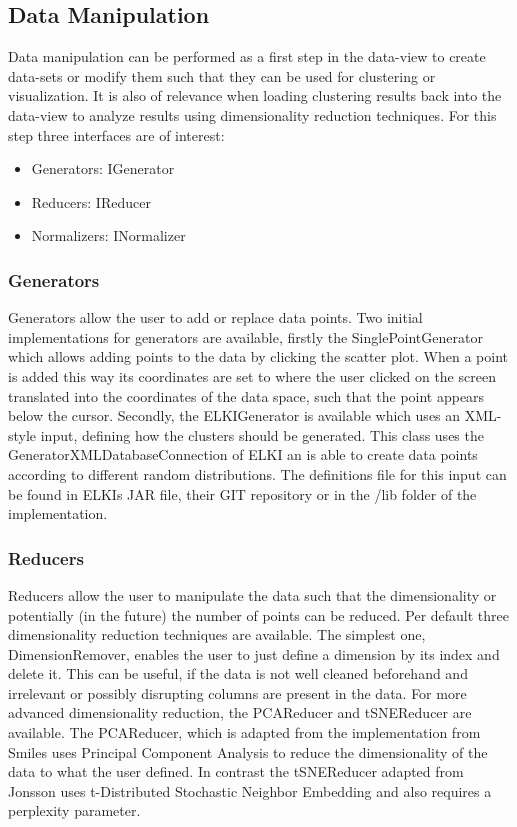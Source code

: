 \documentclass[
	a4paper,
	english,
	twoside,
	openright,               
	11pt                            
	]{report}
\begin{document}
\subsection{Data Manipulation}

Data manipulation can be performed as a first step in the data-view to create data-sets or modify them such that they can be used for clustering or visualization. It is also of relevance when loading clustering results back into the data-view to analyze results using dimensionality reduction techniques. For this step three interfaces are of interest:

\begin{itemize}
  \item Generators: IGenerator
  \item Reducers: IReducer
  \item Normalizers: INormalizer
\end{itemize}

\subsubsection{Generators}
Generators allow the user to add or replace data points. Two initial implementations for generators are available, firstly the SinglePointGenerator which allows adding points to the data by clicking the scatter plot. When a point is added this way its coordinates are set to where the user clicked on the screen translated into the coordinates of the data space, such that the point appears below the cursor. Secondly, the ELKIGenerator is available which uses an XML-style input, defining how the clusters should be generated. This class uses the GeneratorXMLDatabaseConnection of ELKI \cite{10.1007/978-3-540-69497-7_41} an is able to create data points according to different random distributions. The definitions file for this input can be found in ELKIs JAR file, their GIT repository \cite{elkixml} or in the /lib folder of the implementation.

\subsubsection{Reducers}
Reducers allow the user to manipulate the data such that the dimensionality or potentially (in the future) the number of points can be reduced. Per default three dimensionality reduction techniques are available. The simplest one, DimensionRemover, enables the user to just define a dimension by its index and delete it. This can be useful, if the data is not well cleaned beforehand and irrelevant or possibly disrupting columns are present in the data. For more advanced dimensionality reduction, the PCAReducer and tSNEReducer are available. The PCAReducer, which is adapted from the implementation from Smiles \cite{javasmile} uses Principal Component Analysis \cite{pca} to reduce the dimensionality of the data to what the user defined. In contrast the tSNEReducer adapted from Jonsson \cite{javatsne} uses t-Distributed Stochastic Neighbor Embedding \cite{Maaten2008VisualizingDU} and also requires a perplexity parameter.
\end{document}
